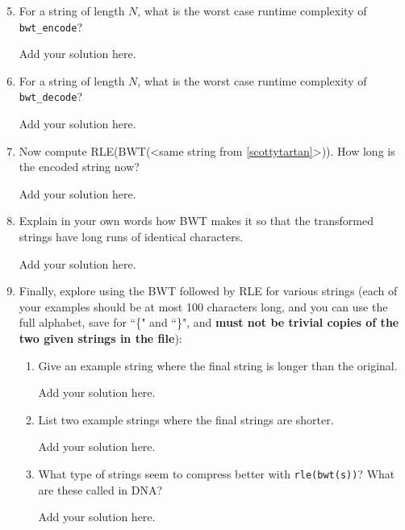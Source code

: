 \begin{enumerate}
\setcounter{enumii}{4}
  \item \label{encode_rutime}For a string of length $N$, what is the worst case runtime complexity of \texttt{bwt\_encode}?
  \begin{solution}
  Add your solution here.
  \end{solution}
  \item \label{decode_runtime}For a string of length $N$, what is the worst case runtime complexity of \texttt{bwt\_decode}?
  \begin{solution}
  Add your solution here.
  \end{solution}
  \item Now compute  RLE(BWT(<same string from \ref{scottytartan}>)). How long is the encoded string now?
  \begin{solution}
  Add your solution here.
  \end{solution}
  \item Explain in your own words how BWT makes it so that the transformed strings have long runs of identical characters.
  \begin{solution}
  Add your solution here.
  \end{solution}
  \item Finally, explore using the BWT followed by RLE for various strings (each of your examples should be at most 100 characters long, and you can use the full alphabet, save for ``\{" and ``\}", and \textbf{must not be trivial copies of the two given strings in the file}):
  \begin{enumerate}
      \item Give an example string where the final string is longer than the original.
      \begin{solution}
      Add your solution here.
      \end{solution}
      \item List two example strings where the final strings are shorter.
      \begin{solution}
      Add your solution here.
      \end{solution}
      \item What type of strings seem to compress better with \texttt{rle(bwt(s))}? What are these called in DNA?
      \begin{solution}
      Add your solution here.
      \end{solution}
  \end{enumerate}
\end{enumerate}

